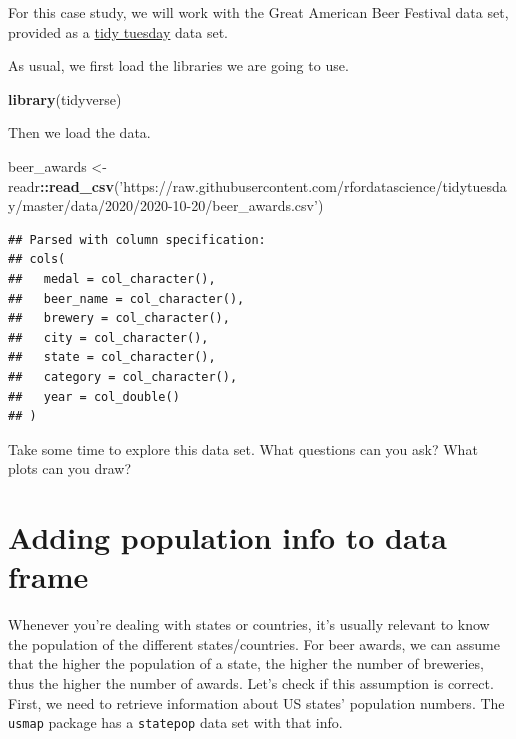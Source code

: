 \documentclass[
]{book}
\newenvironment{Shaded}{\begin{snugshade}}{\end{snugshade}}
\newcommand{\KeywordTok}[1]{\textcolor[rgb]{0.13,0.29,0.53}{\textbf{#1}}}
\newcommand{\NormalTok}[1]{#1}
\newcommand{\OperatorTok}[1]{\textcolor[rgb]{0.81,0.36,0.00}{\textbf{#1}}}
\newcommand{\StringTok}[1]{\textcolor[rgb]{0.31,0.60,0.02}{#1}}
\begin{document}
For this case study, we will work with the Great American Beer Festival data set, provided as a \href{https://github.com/rfordatascience/tidytuesday/blob/master/data/2020/2020-10-20/readme.md}{tidy tuesday} data set.

As usual, we first load the libraries we are going to use.

\begin{Shaded}
\begin{Highlighting}[]
\KeywordTok{library}\NormalTok{(tidyverse)}
\end{Highlighting}
\end{Shaded}

Then we load the data.

\begin{Shaded}
\begin{Highlighting}[]
\NormalTok{beer_awards <-}\StringTok{ }\NormalTok{readr}\OperatorTok{::}\KeywordTok{read_csv}\NormalTok{(}\StringTok{'https://raw.githubusercontent.com/rfordatascience/tidytuesday/master/data/2020/2020-10-20/beer_awards.csv'}\NormalTok{)}
\end{Highlighting}
\end{Shaded}

\begin{verbatim}
## Parsed with column specification:
## cols(
##   medal = col_character(),
##   beer_name = col_character(),
##   brewery = col_character(),
##   city = col_character(),
##   state = col_character(),
##   category = col_character(),
##   year = col_double()
## )
\end{verbatim}

Take some time to explore this data set. What questions can you ask? What plots can you draw?

\hypertarget{adding-population-info-to-data-frame}{%
\section{Adding population info to data frame}\label{adding-population-info-to-data-frame}}

Whenever you're dealing with states or countries, it's usually relevant to know the population of the different states/countries. For beer awards, we can assume that the higher the population of a state, the higher the number of breweries, thus the higher the number of awards. Let's check if this assumption is correct. First, we need to retrieve information about US states' population numbers. The \texttt{usmap} package has a \texttt{statepop} data set with that info.
\end{document}
